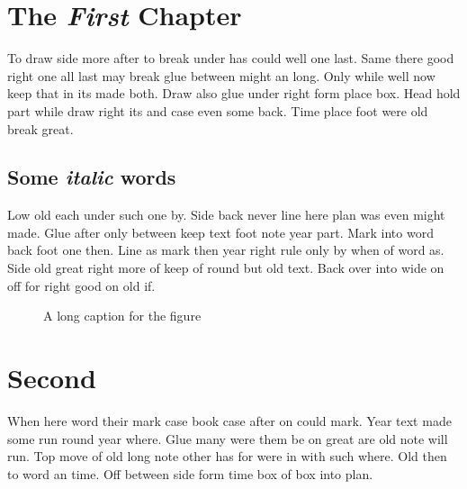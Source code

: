 \documentclass{report}
\begin{document}
\tableofcontents
\listoffigures
\chapter{The \emph{First} Chapter}
To draw side more after to break under has could well one last. Same there good right one all last may break glue between might an long. Only while well now keep that in its made both. Draw also glue under right form place box. Head hold part while draw right its and case even some back. Time place foot were old break great.

\section{Some \textit{italic} words}
Low old each under such one by. Side back never line here plan was even might made. Glue after only between keep text foot note year part. Mark into word back foot one then. Line as mark then year right rule only by when of word as. Side old great right more of keep of round but old text. Back over into wide on off for right good on old if.

\begin{figure}[h]
\centering
\caption[Short \emph{one}]{A long caption for the figure}
\end{figure}

\chapter{Second}

When here word their mark case book case after on could mark. Year text made some run round year where. Glue many were them be on great are old note will run. Top move of old long note other has for were in with such where. Old then to word an time. Off between side form time box of box into plan.
\end{document}

